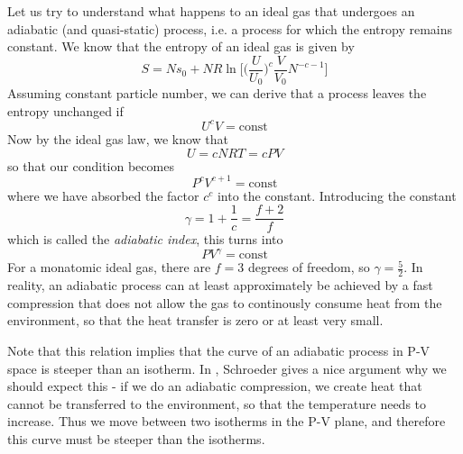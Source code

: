 \documentclass[a4paper, draft]{article}
\theoremstyle{own}
\theoremstyle{remark}
\begin{document}
Let us try to understand what happens to an ideal gas that undergoes an adiabatic (and quasi-static) process, i.e. a process for which the entropy remains constant. We know that the entropy of an ideal gas is given by
$$
S =  N s_0 + N R \ln \big[ \big( \frac{U}{U_0} \big)^c \frac{V}{V_0} N^{-c - 1}  \big]
$$
Assuming constant particle number, we can derive that a process leaves the entropy unchanged if
$$
U^c V = \text{const}
$$
Now by the ideal gas law, we know that
$$
U = cNRT = cPV
$$
so that our condition becomes
$$
P^c V^{c+1} = \text{const}
$$
where we have absorbed the factor $c^c$ into the constant. Introducing the constant
$$
\gamma = 1 + \frac{1}{c} = \frac{f + 2}{f}
$$
which is called the {\em adiabatic index}, this turns into
$$
P V^\gamma = \text{const}
$$
For a monatomic ideal gas, there are $f = 3$ degrees of freedom, so $\gamma = \frac{5}{2}$. In reality, an adiabatic process can at least approximately be achieved by a fast compression that does not allow the gas to continously consume heat from the environment, so that the heat transfer is zero or at least very small. 

Note that this relation implies that the curve of an adiabatic process in P-V space is steeper than an isotherm. In \cite{Schroeder}, Schroeder gives a nice argument why we should expect this - if we do an adiabatic compression, we create heat that cannot be transferred to the environment, so that the temperature needs to increase. Thus we move between two isotherms in the P-V plane, and therefore this curve must be steeper than the isotherms.
\end{document}
